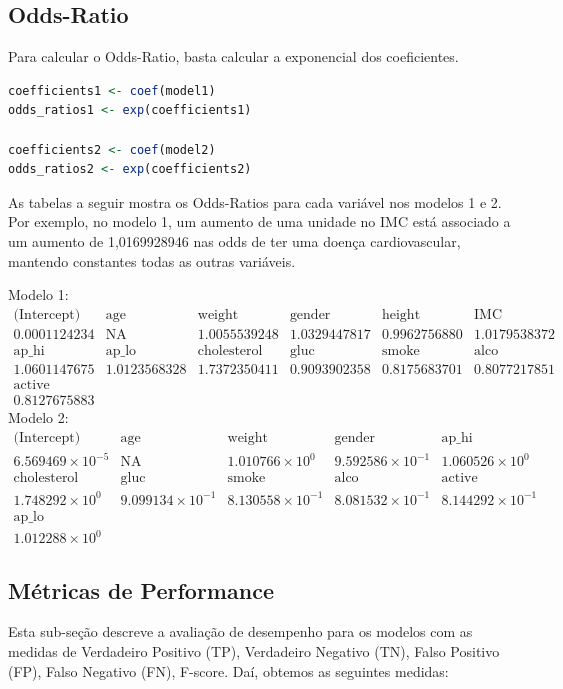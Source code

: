 \documentclass[article,11pt,a4paper,brazil]{abntex2}
\begin{document}
	\subsection{Odds-Ratio}
	\noindent Para calcular o Odds-Ratio, basta calcular a exponencial dos coeficientes.
	\begin{lstlisting}[language=R]
coefficients1 <- coef(model1)	
odds_ratios1 <- exp(coefficients1)
	
coefficients2 <- coef(model2)	
odds_ratios2 <- exp(coefficients2)
	\end{lstlisting}
	As tabelas a seguir mostra os Odds-Ratios para cada variável nos modelos 1 e 2. Por exemplo, no modelo 1, um aumento de uma unidade no IMC está associado a um aumento de 1,0169928946 nas odds de ter uma doença cardiovascular, mantendo constantes todas as outras variáveis.
	
	Modelo 1:
\[
\begin{array}{rrrrrr}
	\text {(Intercept)} & \text {age} & \text {weight} & \text {gender} & \text {height} & \text {IMC} \\
	0.0001124234 & \text {NA} & 1.0055539248 & 1.0329447817 & 0.9962756880 & 1.0179538372 \\
	\text{ap\_hi} & \text{ap\_lo} & \text{cholesterol} & \text{gluc} & \text{smoke} & \text{alco} \\
	1.0601147675 & 1.0123568328 & 1.7372350411 & 0.9093902358 & 0.8175683701 & 0.8077217851 \\
	\text{active} \\
	0.8127675883 
\end{array}
\]
	Modelo 2:
\[
\begin{array}{rrrrrr}
	\text{(Intercept)} & \text{age} & \text{weight} & \text{gender} & \text{ap\_hi}\\
	6.569469 \times 10^{-5} & \text{NA} & 1.010766 \times 10^{0} & 9.592586 \times 10^{-1} & 1.060526 \times 10^{0} \\ 
	\text{cholesterol} & \text{gluc} & \text{smoke} & \text{alco} & \text{active} & \\
	1.748292 \times 10^{0} & 9.099134 \times 10^{-1} & 8.130558 \times 10^{-1} & 8.081532 \times 10^{-1} & 8.144292 \times 10^{-1} \\
 \text{ap\_lo}\\
  1.012288 \times 10^{0} 
 
\end{array}
\]
	\subsection{Métricas de Performance}
	Esta sub-seção descreve a avaliação de desempenho para os modelos com as medidas de Verdadeiro Positivo (TP), Verdadeiro Negativo (TN), Falso Positivo (FP), Falso Negativo (FN), F-score. Daí, obtemos as seguintes medidas:
	
\end{document}
